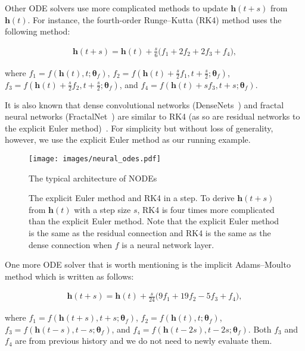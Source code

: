 \documentclass[sigconf]{acmart}
\begin{document}
Other ODE solvers use more complicated methods to update $\bm{h}(t + s)$ from $\bm{h}(t)$. For instance, the fourth-order Runge--Kutta (RK4) method uses the following method:
\begin{linenomath*}\begin{align}\label{eq:rk4}
\bm{h}(t + s) = \bm{h}(t) + \frac{s}{6}\Big(f_1 + 2f_2 + 2f_3 + f_4\Big),
\end{align}\end{linenomath*}where $f_1 = f(\bm{h}(t), t;\bm{\theta}_f)$, $f_2 = f(\bm{h}(t) + \frac{s}{2}f_1, t+\frac{s}{2};\bm{\theta}_f)$, $f_3 = f(\bm{h}(t) + \frac{s}{2}f_2, t+\frac{s}{2};\bm{\theta}_f)$, and $f_4 = f(\bm{h}(t)+sf_3, t+s;\bm{\theta}_f)$.

It is also known that dense convolutional networks (DenseNets~\cite{zhu2019convolutional}) and fractal neural networks (FractalNet~\cite{Larsson2017FractalNetUN}) are similar to RK4 (as so are residual networks to the explicit Euler method)~\cite{pmlr-v80-lu18d}. For simplicity but without loss of generality, however, we use the explicit Euler method as our running example.

\begin{figure}[!t]
\centering
\texttt{[image: images/neural\_odes.pdf]}
\caption{The typical architecture of NODEs}\label{fig:archi2}
\end{figure}

\begin{figure}[!t]
\centering
{}
\caption{The explicit Euler method and RK4 in a step. To derive $\bm{h}(t + s)$ from $\bm{h}(t)$ with a step size $s$, RK4 is four times more complicated than the explicit Euler method. Note that the explicit Euler method is the same as the residual connection and RK4 is the same as the dense connection when $f$ is a neural network layer.}\label{fig:solvers}
\end{figure}

One more ODE solver that is worth mentioning is the implicit Adams–Moulto method which is written as follows:
\begin{linenomath*}\begin{align}\label{eq:adam}
\bm{h}(t + s) = \bm{h}(t) + \frac{s}{24}\Big(9f_1 + 19f_2 - 5f_3 + f_4\Big),
\end{align}\end{linenomath*}where $f_1 = f(\bm{h}(t+s), t+s;\bm{\theta}_f)$, $f_2 = f(\bm{h}(t), t;\bm{\theta}_f)$, $f_3 = f(\bm{h}(t-s), t-s;\bm{\theta}_f)$, and $f_4 = f(\bm{h}(t-2s), t-2s;\bm{\theta}_f)$. Both $f_3$ and $f_4$ are from previous history and we do not need to newly evaluate them.
\end{document}

